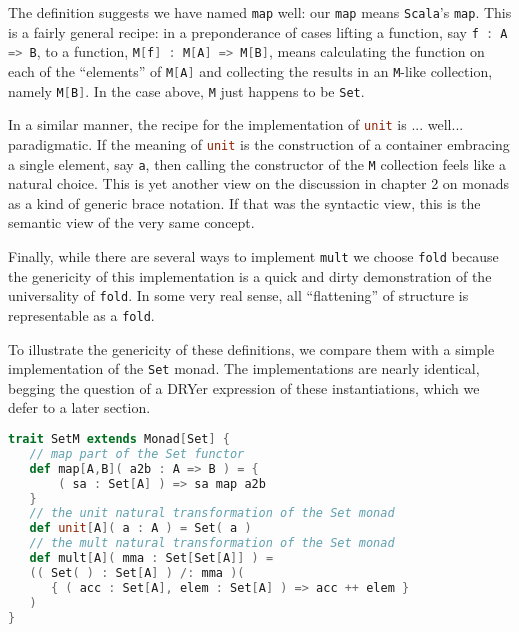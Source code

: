The definition suggests we have named
\lstinline[language=Scala,mathescape=true]!map! well: our
\lstinline[language=Scala,mathescape=true]!map! means \texttt{Scala}'s
\lstinline[language=Scala,mathescape=true]!map!. This is a fairly
general recipe: in a preponderance of cases lifting a function, say
\lstinline[language=Scala,mathescape=true]!f : A => B!, to a function,
\lstinline[language=Scala,mathescape=true]!M[f] : M[A] => M[B]!, means
calculating the function on each of the ``elements'' of
\lstinline[language=Scala,mathescape=true]!M[A]! and collecting the
results in an \lstinline[language=Scala,mathescape=true]!M!-like
collection, namely
\lstinline[language=Scala,mathescape=true]!M[B]!. In the case above,
\lstinline[language=Scala,mathescape=true]!M! just happens to be
\lstinline[language=Scala,mathescape=true]!Set!.

In a similar manner, the recipe for the implementation of
\lstinline[language=Scala,mathescape=true]!unit! is
... well... paradigmatic. If the meaning of
\lstinline[language=Scala,mathescape=true]!unit! is the construction
of a container embracing a single element, say
\lstinline[language=Scala,mathescape=true]!a!, then calling the
constructor of the \lstinline[language=Scala,mathescape=true]!M!
collection feels like a natural choice. This is yet another view on
the discussion in chapter 2 on monads as a kind of generic brace
notation. If that was the syntactic view, this is the semantic view of
the very same concept.

Finally, while there are several ways to implement
\lstinline[language=Scala,mathescape=true]!mult! we choose
\lstinline[language=Scala,mathescape=true]!fold! because the
genericity of this implementation is a quick and dirty demonstration
of the universality of
\lstinline[language=Scala,mathescape=true]!fold!. In some very real
sense, all ``flattening'' of structure is representable as a
\lstinline[language=Scala,mathescape=true]!fold!.

To illustrate the genericity of these definitions, we compare them
with a simple implementation of the
\lstinline[language=Scala,mathescape=true]!Set! monad. The
implementations are nearly identical, begging the question of a DRYer
expression of these instantiations, which we defer to a later section.

\break
\begin{lstlisting}[language=Scala,mathescape=true]
trait SetM extends Monad[Set] {
   // map part of the Set functor
   def map[A,B]( a2b : A => B ) = {
       ( sa : Set[A] ) => sa map a2b
   }
   // the unit natural transformation of the Set monad
   def unit[A]( a : A ) = Set( a )
   // the mult natural transformation of the Set monad
   def mult[A]( mma : Set[Set[A]] ) =
   (( Set( ) : Set[A] ) /: mma )(
      { ( acc : Set[A], elem : Set[A] ) => acc ++ elem }
   )
}
\end{lstlisting}

